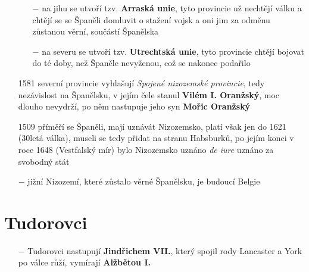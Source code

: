 \documentclass{article}
\begin{document}
\begin{itemize}
    \begin{itemize}
        \vspace{-0.5em}
        \setlength\itemsep{0.15em}
        \item[$-$] na jihu se utvoří tzv. \textbf{Arraská unie}, tyto provincie už nechtějí válku a chtějí se se Španěli domluvit o stažení vojsk a oni jim za odměnu zůstanou věrní, součástí Španělska
        \item[$-$] na severu se utvoří tzv. \textbf{Utrechtská unie}, tyto provincie chtějí bojovat do té doby, než Španěle nevyženou, což se nakonec podařilo
    \end{itemize}
    \item[1581] severní provincie vyhlašují \textit{Spojené nizozemské provincie}, tedy nezávislost na Španělsku, v jejím čele stanul \textbf{Vilém I. Oranžský}, moc dlouho nevydrží, po něm nastupuje jeho syn \textbf{Mořic Oranžský}
    \item[1509] příměří se Španěli, mají uznávát Nizozemsko, platí však jen do 1621 (30letá válka), museli se tedy přidat na stranu Habsburků, po jejím konci v roce 1648 (Vestfalský mír) bylo Nizozemsko uznáno \textit{de iure} uznáno za svobodný stát
    \item[$-$] jižní Nizozemí, které zůstalo věrné Španělsku, je budoucí Belgie
\end{itemize}

\section*{Tudorovci}

\begin{itemize}
    \vspace{-0.5em}
    \setlength\itemsep{0.15em}
    \item[$-$] Tudorovci nastupují \textbf{Jindřichem VII.}, který spojil rody Lancaster a York po válce růží, vymírají \textbf{Alžbětou I.}
\end{itemize}
\end{document}
